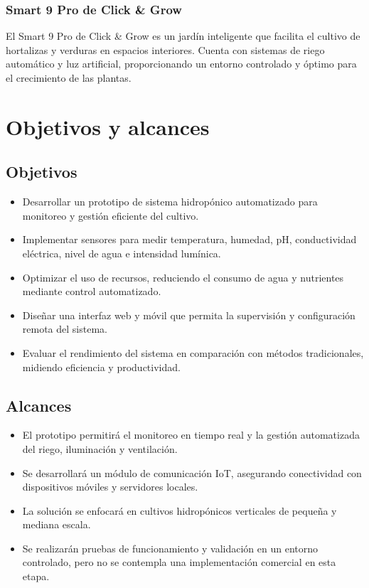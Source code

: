 \subsubsection{Smart 9 Pro de Click \& Grow}
El Smart 9 Pro de Click \& Grow es un jardín inteligente que facilita el cultivo de hortalizas y verduras en espacios interiores. Cuenta con sistemas de riego automático y luz artificial, proporcionando un entorno controlado y óptimo para el crecimiento de las plantas.

\section{Objetivos y alcances}


\subsection{Objetivos}
\begin{itemize}
    \item Desarrollar un prototipo de sistema hidropónico automatizado para monitoreo y gestión eficiente del cultivo.
    \item Implementar sensores para medir temperatura, humedad, pH, conductividad eléctrica, nivel de agua e intensidad lumínica.
    \item Optimizar el uso de recursos, reduciendo el consumo de agua y nutrientes mediante control automatizado.
    \item Diseñar una interfaz web y móvil que permita la supervisión y configuración remota del sistema.
    \item Evaluar el rendimiento del sistema en comparación con métodos tradicionales, midiendo eficiencia y productividad.
\end{itemize}

\subsection{Alcances}

\begin{itemize}
    \item El prototipo permitirá el monitoreo en tiempo real y la gestión automatizada del riego, iluminación y ventilación.
    \item Se desarrollará un módulo de comunicación IoT, asegurando conectividad con dispositivos móviles y servidores locales.
    \item La solución se enfocará en cultivos hidropónicos verticales de pequeña y mediana escala.
    \item Se realizarán pruebas de funcionamiento y validación en un entorno controlado, pero no se contempla una implementación comercial en esta etapa.
\end{itemize}

